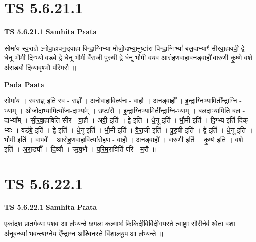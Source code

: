 \documentclass[17pt]{extarticle}
\begin{document}
\section*{ TS 5.6.21.1 }

\textbf{TS 5.6.21.1 } \newline
\textbf{Samhita Paata} \newline

सोमा॑य स्व॒राज्ञे॑-ऽनोवा॒हाव॑न॒ड्वाहा॑-विन्द्रा॒ग्निभ्या॑-मोजो॒दाभ्या॒मुष्टा॑रा-विन्द्रा॒ग्निभ्यां᳚ बल॒दाभ्याꣳ॑ सीरवा॒हाववी॒ द्वे धे॒नू भौ॒मी दि॒ग्भ्यो वड॑बे॒ द्वे धे॒नू भौ॒मी वै॑रा॒जी पु॑रु॒षी द्वे धे॒नू भौ॒मी व॒यव॑ आरोहणवा॒हाव॑न॒ड्वाहौ॑ वारु॒णी कृ॒ष्णे व॒शे अ॑रा॒ड्यौ॑ दि॒व्यावृ॑ष॒भौ प॑रिम॒रौ ॥ \newline

\textbf{Pada Paata} \newline

सोमा॑य । स्व॒राज्ञ्॒ इति॑ स्व - राज्ञे᳚ । अ॒नो॒वा॒हावित्य॑नः - वा॒हौ । अ॒न॒ड्वाहौ᳚ । इ॒न्द्रा॒ग्निभ्या॒मिती᳚न्द्रा॒ग्नि - भ्या॒म् । ओ॒जो॒दाभ्या॒मित्यो॑जः-दाभ्या᳚म् । उष्टा॑रौ । इ॒न्द्रा॒ग्निभ्या॒मिती᳚न्द्रा॒ग्नि-भ्या॒म् । ब॒ल॒दाभ्या॒मिति॑ बल - दाभ्या᳚म् । सी॒र॒वा॒हाविति॑ सीर - वा॒हौ । अवी॒ इति॑ । द्वे इति॑ । धे॒नू इति॑ । भौ॒मी इति॑ । दि॒ग्भ्य इति॑ दिक् - भ्यः । वड॑बे॒ इति॑ । द्वे इति॑ । धे॒नू इति॑ । भौ॒मी इति॑ । वै॒रा॒जी इति॑ । पु॒रु॒षी इति॑ । द्वे इति॑ । धे॒नू इति॑ । भौ॒मी इति॑ । वा॒यवे᳚ । आ॒रो॒ह॒ण॒वा॒हावित्या॑रोहण - वा॒हौ । अ॒न॒ड्वाहौ᳚ । वा॒रु॒णी इति॑ । कृ॒ष्णे इति॑ । व॒शे इति॑ । अ॒रा॒ड्यौ᳚ । दि॒व्यौ । ऋ॒ष॒भौ । प॒रि॒म॒राविति॑ परि - म॒रौ ॥  \newline




\section*{ TS 5.6.22.1 }

\textbf{TS 5.6.22.1 } \newline
\textbf{Samhita Paata} \newline

एका॑दश प्रा॒तर्ग॒व्याः प॒शव॒ आ ल॑भ्यन्ते छग॒लः क॒ल्माषः॑ किकिदी॒विर्वि॑दी॒गय॒स्ते त्वा॒ष्ट्राः सौ॒रीर्नव॑ श्वे॒ता व॒शा अ॑नूब॒न्ध्या॑ भवन्त्याग्ने॒य ऐ᳚न्द्रा॒ग्न आ᳚श्वि॒नस्ते वि॑शालयू॒प आ ल॑भ्यन्ते ॥ \newline
\end{document}
